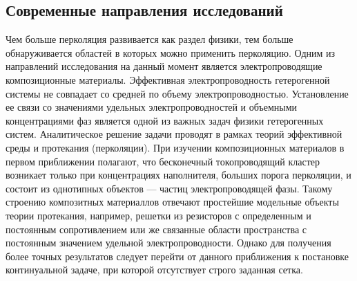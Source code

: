 \subsection{Современные направления исследований}

Чем больше перколяция развивается как раздел физики, тем больше обнаруживается областей в которых можно применить перколяцию.
Одним из направлений исследования на данный момент является электропроводящие композиционные материалы. 
Эффективная электропроводность гетерогенной системы не совпадает со средней по объему электропроводностью. 
Установление ее связи со значениями удельных электропроводностей и объемными концентрациями фаз является одной из важных задач физики гетерогенных систем. 
Аналитическое решение задачи проводят в рамках теорий эффективной среды и протекания (перколяции). 
При изучении композиционных материалов в первом приближении полагают, что бесконечный токопроводящий кластер возникает только при концентрациях наполнителя, больших порога перколяции, и состоит из однотипных объектов — частиц электропроводящей фазы. 
Такому строению композитных материаллов отвечают простейшие модельные объекты теории протекания, например, решетки из резисторов с определенным и постоянным сопротивлением или же связанные области пространства с постоянным значением удельной электропроводности. 
Однако для получения более точных результатов следует перейти от данного приближения к постановке континуальной задаче, при которой отсутствует строго заданная сетка.

